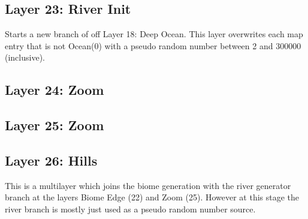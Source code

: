 \documentclass{article}
\begin{document}
	\subsection{Layer 23: River Init}

	Starts a new branch of off Layer 18: Deep Ocean. This layer overwrites each map entry that is not Ocean(0) with a pseudo random number between 2 and 300000 (inclusive).

	\subsection{Layer 24: Zoom}
	\subsection{Layer 25: Zoom}

	\subsection{Layer 26: Hills}
	This is a multilayer which joins the biome generation with the river generator branch at the layers Biome Edge (22) and Zoom (25). However at this stage the river branch is mostly just used as a pseudo random number source.
\end{document}
